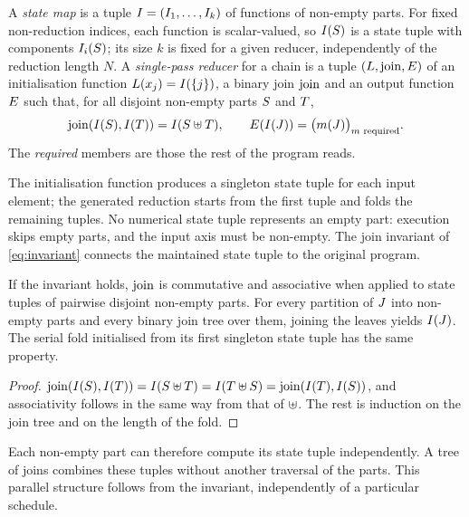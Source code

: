 \begin{definition}
\label{def:reducer}
A \emph{state map} is a tuple $I=(I_1,\dots,I_k)$ of functions of non-empty parts.
For fixed non-reduction indices, each function is scalar-valued, so $I(S)$ is a state tuple with components $I_i(S)$; its size $k$ is fixed for a given reducer, independently of the reduction length $N$.
A \emph{single-pass reducer} for a chain is a tuple $(L,\operatorname{join},E)$ of an initialisation function $L(x_j)=I(\{j\})$, a binary join $\operatorname{join}$ and an output function $E$ such that, for all disjoint non-empty parts $S$ and $T$,
\begin{equation}
\label{eq:invariant}
\operatorname{join}(I(S),I(T))=I(S\uplus T),\qquad
E(I(J))=\bigl(m(J)\bigr)_{m\text{ required}}.
\end{equation}
The \emph{required} members are those the rest of the program reads.
\end{definition}

The initialisation function produces a singleton state tuple for each input element; the generated reduction starts from the first tuple and folds the remaining tuples.
No numerical state tuple represents an empty part: execution skips empty parts, and the input axis must be non-empty.
The join invariant of \cref{eq:invariant} connects the maintained state tuple to the original program.

\begin{lemma}
\label{lem:laws}
If the invariant holds, $\operatorname{join}$ is commutative and associative when applied to state tuples of pairwise disjoint non-empty parts.
For every partition of $J$ into non-empty parts and every binary join tree over them, joining the leaves yields $I(J)$.
The serial fold initialised from its first singleton state tuple has the same property.
\end{lemma}

\begin{proof}
$\operatorname{join}(I(S),I(T))=I(S\uplus T)=I(T\uplus S)=\operatorname{join}(I(T),I(S))$, and associativity follows in the same way from that of $\uplus$.
The rest is induction on the join tree and on the length of the fold.
\end{proof}

Each non-empty part can therefore compute its state tuple independently.
A tree of joins combines these tuples without another traversal of the parts.
This parallel structure follows from the invariant, independently of a particular schedule.

